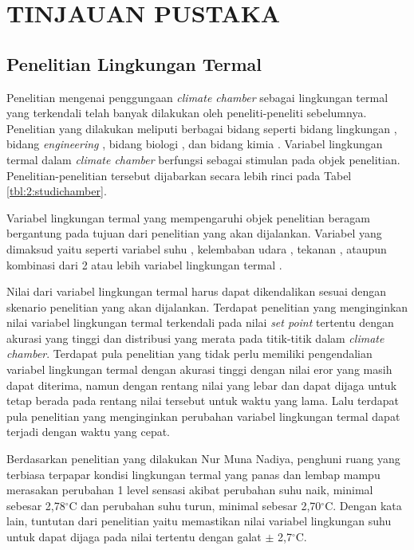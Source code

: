 \chapter{TINJAUAN PUSTAKA}
\label{pustaka}

\section{Penelitian Lingkungan Termal}

Penelitian mengenai penggungaan \textit{climate chamber} sebagai lingkungan termal yang terkendali telah banyak dilakukan oleh peneliti-peneliti sebelumnya. Penelitian yang dilakukan meliputi berbagai bidang seperti bidang lingkungan \cite{article2.1:1} \cite{article2.1:2} \cite{article2.1:4}, bidang \textit{engineering} \cite{article2.1:5}, bidang biologi \cite{article2.1:6}\cite{article2.1:7}, dan bidang kimia \cite{article2.1:8}. Variabel lingkungan termal dalam \textit{climate chamber} berfungsi sebagai stimulan pada objek penelitian. Penelitian-penelitian tersebut dijabarkan secara lebih rinci pada Tabel \ref{tbl:2:studichamber}.

Variabel lingkungan termal yang mempengaruhi objek penelitian beragam bergantung pada tujuan dari penelitian yang akan dijalankan. Variabel yang dimaksud yaitu seperti variabel suhu \cite{article2.1:5}\cite{article2.1:6}\cite{article2.1:7}\cite{article2.1:8}\cite{article2.1:9}, kelembaban udara \cite{article2.1:8}, tekanan \cite{article2.1:4}, ataupun kombinasi dari 2 atau lebih variabel lingkungan termal \cite{article2.1:8}.

Nilai dari variabel lingkungan termal harus dapat dikendalikan sesuai dengan skenario penelitian yang akan dijalankan. Terdapat penelitian yang menginginkan nilai variabel lingkungan termal terkendali pada nilai \textit{set point} tertentu dengan akurasi yang tinggi dan distribusi yang merata pada titik-titik dalam \textit{climate chamber}. Terdapat pula penelitian yang tidak perlu memiliki pengendalian variabel lingkungan termal dengan akurasi tinggi dengan nilai eror yang masih dapat diterima, namun dengan rentang nilai yang lebar dan dapat dijaga untuk tetap berada pada rentang nilai tersebut untuk waktu yang lama. Lalu terdapat pula penelitian yang menginginkan perubahan variabel lingkungan termal dapat terjadi dengan waktu yang cepat.

Berdasarkan penelitian yang dilakukan Nur Muna Nadiya\cite{skripsiMuna}, penghuni ruang yang terbiasa terpapar kondisi lingkungan termal yang panas dan lembap mampu merasakan perubahan 1 level sensasi akibat perubahan suhu naik, minimal sebesar 2,78$^{\circ}$C dan perubahan suhu turun, minimal sebesar 2,70$^{\circ}$C. Dengan kata lain, tuntutan dari penelitian yaitu memastikan nilai variabel lingkungan suhu untuk dapat dijaga pada nilai tertentu dengan galat $\pm$ 2,7$^{\circ}$C.

